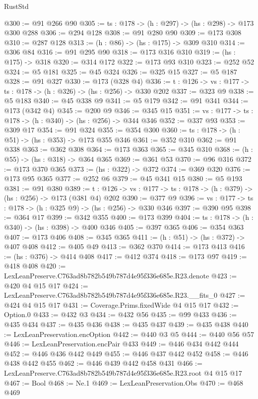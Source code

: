 \begin{lexlean}{RustStd}
\begin{coremodule}
@300 := @91 @266 @90
@305 := {ts : @178} -> (h : @297) -> (hs : @298) -> @173 @300 @288
@306 := @294 @128
@308 := @91 @280 @90
@309 := @173 @308
@310 := @287 @128
@313 := (h : @86) -> (hs : @175) -> @309 @310
@314 := @306 @84
@316 := @91 @295 @90
@318 := @173 @316 @310
@319 := (hs : @175) -> @318
@320 := @314 @172
@322 := @173 @93 @310
@323 := @252 @52
@324 := @5 @181
@325 := @45 @324
@326 := @325 @15
@327 := @5 @187
@328 := @91 @327
@330 := @173 (@328 @4)
@336 := {t : @126} -> {vs : @177} -> {ts : @178} -> (h : @326) -> (hs : @256) -> @330 @202
@337 := @323 @9
@338 := @5 @183
@340 := @45 @338 @9
@341 := @5 @179
@342 := @91 @341
@344 := @173 (@342 @4)
@345 := @200 @9
@346 := @345 @15
@351 := {vs : @177} -> {ts : @178} -> (h : @340) -> (hs : @256) -> @344 @346
@352 := @337 @93
@353 := @309 @17
@354 := @91 @324
@355 := @354 @300
@360 := {ts : @178} -> (h : @51) -> (hs : @353) -> @173 @355 @346
@361 := @352 @310
@362 := @91 @338
@363 := @362 @308
@364 := @173 @363
@365 := @345 @310
@368 := (h : @55) -> (hs : @318) -> @364 @365
@369 := @361 @53
@370 := @96 @316
@372 := @173 @370 @365
@373 := (hs : @322) -> @372
@374 := @369 @320
@376 := @173 @95 @365
@377 := @252 @6
@379 := @45 @341 @15
@380 := @5 @193
@381 := @91 @380
@389 := {t : @126} -> {vs : @177} -> {ts : @178} -> (h : @379) -> (hs : @256) -> @173 (@381 @4) @202
@390 := @377 @9
@396 := {vs : @177} -> {ts : @178} -> (h : @325 @9) -> (hs : @256) -> @330 @346
@397 := @390 @95
@398 := @364 @17
@399 := @342 @355
@400 := @173 @399
@404 := {ts : @178} -> (h : @340) -> (hs : @398) -> @400 @346
@405 := @397 @365
@406 := @354 @363
@407 := @173 @406
@408 := @345 @365
@411 := (h : @51) -> (hs : @372) -> @407 @408
@412 := @405 @49
@413 := @362 @370
@414 := @173 @413
@416 := (hs : @376) -> @414 @408
@417 := @412 @374
@418 := @173 @97
@419 := @418 @408
@420 := LexLeanPreserve.C763ad8b782b549b787d4e95f336e685e.R23.denote
@423 := @420 @4 @15 @17
@424 := LexLeanPreserve.C763ad8b782b549b787d4e95f336e685e.R23.__fits_0
@427 := @424 @4 @15 @17
@431 := Coverage.Prims.fixedWide @4 @15 @17
@432 := Option.{0}
@433 := @432 @3
@434 := @432 @56
@435 := @99 @433
@436 := @435 @434
@437 := @435 @436
@438 := @435 @437
@439 := @435 @438
@440 := LexLeanPreservation.encOption
@442 := @440 @3 @5
@444 := @440 @56 @57
@446 := LexLeanPreservation.encPair @433
@449 := @446 @434 @442 @444
@452 := @446 @436 @442 @449
@455 := @446 @437 @442 @452
@458 := @446 @438 @442 @455
@462 := @446 @439 @442 @458 @431
@466 := LexLeanPreserve.C763ad8b782b549b787d4e95f336e685e.R23.root @4 @15 @17
@467 := Bool
@468 := Ne.{1}
@469 := LexLeanPreservation.Obs
@470 := @468 @469

\end{coremodule}
\end{lexlean}
